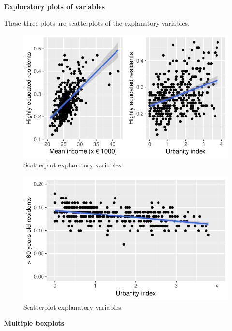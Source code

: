 \documentclass[11pt,]{article}
\begin{document}
\textbf{Exploratory plots of variables}

These three plots are scatterplots of the explanatory variables.

\begin{figure}[H]

{\centering \includegraphics{Report_files/figure-latex/unnamed-chunk-6-1} 

}

\caption{\label{5}Scatterplot explanatory variables}\label{fig:unnamed-chunk-61}
\end{figure}\begin{figure}[H]

{\centering \includegraphics{Report_files/figure-latex/unnamed-chunk-6-2} 

}

\caption{\label{5}Scatterplot explanatory variables}\label{fig:unnamed-chunk-62}
\end{figure}

\textbf{Multiple boxplots}
\end{document}
